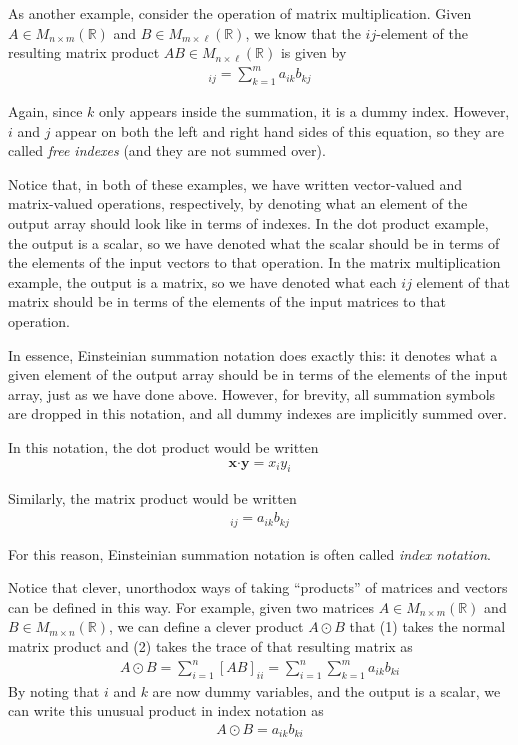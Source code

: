 As another example, consider the operation of matrix multiplication. 
Given $A \in M_{n \times m}(\mathbb{R})$ and $B \in M_{m \times \ell} (\mathbb{R})$, we know that the $ij$-element of the resulting matrix product $AB \in M_{n \times \ell}(\mathbb{R})$ is given by
\begin{align*}
[AB]_{ij} = \sum_{k=1}^{m} a_{ik}b_{kj}
\end{align*}

Again, since $k$ only appears inside the summation, it is a dummy index. 
However, $i$ and $j$ appear on both the left and right hand sides of this equation, so they are called \emph{free indexes} (and they are not summed over).

Notice that, in both of these examples, we have written vector-valued and matrix-valued operations, respectively, by denoting what an element of the output array should look like in terms of indexes.
In the dot product example, the output is a scalar, so we have denoted what the scalar should be in terms of the elements of the input vectors to that operation.
In the matrix multiplication example, the output is a matrix, so we have denoted what each $ij$ element of that matrix should be in terms of the elements of the input matrices to that operation.

In essence, Einsteinian summation notation does exactly this: it denotes what a given element of the output array should be in terms of the elements of the input array, just as we have done above.
However, for brevity, all summation symbols are dropped in this notation, and all dummy indexes are implicitly summed over.

In this notation, the dot product would be written
\begin{align*}
\mathbf{x} \boldsymbol{\cdot} \mathbf{y} = x_i y_i
\end{align*}

Similarly, the matrix product would be written
\begin{align*}
[AB]_{ij} = a_{ik}b_{kj}
\end{align*}

For this reason, Einsteinian summation notation is often called \emph{index notation}.

Notice that clever, unorthodox ways of taking ``products'' of matrices and vectors can be defined in this way.
For example, given two matrices  $A \in M_{n \times m}(\mathbb{R})$ and $B \in M_{m \times n} (\mathbb{R})$, we can define a clever product $A \odot B$ that (1) takes the normal matrix product and (2) takes the trace of that resulting matrix as
\begin{align*}
A \odot B = \sum_{i=1}^{n}[AB]_{ii} = \sum_{i=1}^{n} \sum_{k=1}^{m} a_{ik} b_{ki}
\end{align*}
By noting that $i$ and $k$ are now dummy variables, and the output is a scalar, we can write this unusual product in index notation as
\begin{align*}
A \odot B = a_{ik} b_{ki}
\end{align*}


